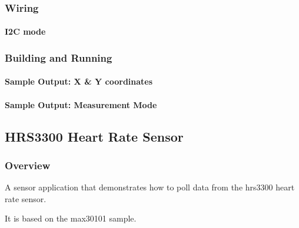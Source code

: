 \documentclass[letterpaper,10pt,english]{sphinxmanual}
\begin{document}
\subsubsection{Wiring}
\label{\detokenize{samples/sensor/cst816s/README:wiring}}

\paragraph{I2C mode}
\label{\detokenize{samples/sensor/cst816s/README:i2c-mode}}

\subsubsection{Building and Running}
\label{\detokenize{samples/sensor/cst816s/README:building-and-running}}

\paragraph{Sample Output: X \& Y coordinates}
\label{\detokenize{samples/sensor/cst816s/README:sample-output-x-y-coordinates}}

\paragraph{Sample Output: Measurement Mode}
\label{\detokenize{samples/sensor/cst816s/README:sample-output-measurement-mode}}
\begin{sphinxVerbatim}[commandchars=\\\{\}]

\end{sphinxVerbatim}


\subsection{HRS3300 Heart Rate Sensor}
\label{\detokenize{samples/sensor/hrs3300/README:hrs3300-heart-rate-sensor}}\label{\detokenize{samples/sensor/hrs3300/README:hrs3300}}\label{\detokenize{samples/sensor/hrs3300/README::doc}}

\subsubsection{Overview}
\label{\detokenize{samples/sensor/hrs3300/README:overview}}
A sensor application that demonstrates how to poll data from the hrs3300 heart
rate sensor.

It is based on the max30101 sample.
\end{document}
